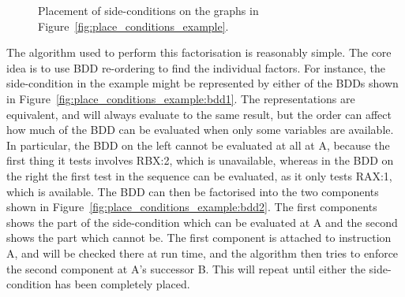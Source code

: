 \begin{figure}
  \begin{center}
  \end{center}
  \caption{Placement of side-conditions on the graphs in
    Figure~\ref{fig:place_conditions_example}.}
  \label{fig:place_conditions_example:placed}
\end{figure}

The algorithm used to perform this factorisation is reasonably simple.
The core idea is to use BDD re-ordering to find the individual
factors.  For instance, the side-condition in the example might be
represented by either of the BDDs shown in
Figure~\ref{fig:place_conditions_example:bdd1}.  The representations
are equivalent, and will always evaluate to the same result, but the
order can affect how much of the BDD can be evaluated when only some
variables are available.  In particular, the BDD on the left cannot be
evaluated at all at A, because the first thing it tests involves
RBX:2, which is unavailable, whereas in the BDD on the right the first
test in the sequence can be evaluated, as it only tests RAX:1, which
is available.  The BDD can then be factorised into the two components
shown in Figure~\ref{fig:place_conditions_example:bdd2}.  The first
components shows the part of the side-condition which can be evaluated
at A and the second shows the part which cannot be.  The first
component is attached to instruction A, and will be checked there at
run time, and the algorithm then tries to enforce the second component
at A's successor B.  This will repeat until either the side-condition
has been completely placed.

